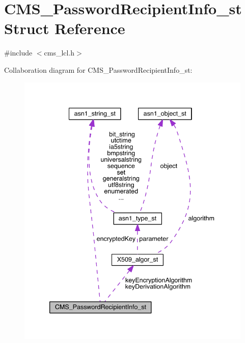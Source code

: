 \hypertarget{struct_c_m_s___password_recipient_info__st}{}\section{C\+M\+S\+\_\+\+Password\+Recipient\+Info\+\_\+st Struct Reference}
\label{struct_c_m_s___password_recipient_info__st}


{\ttfamily \#include $<$cms\+\_\+lcl.\+h$>$}



Collaboration diagram for C\+M\+S\+\_\+\+Password\+Recipient\+Info\+\_\+st\+:\nopagebreak
\begin{figure}[H]
\begin{center}
\leavevmode
\includegraphics[width=339pt]{struct_c_m_s___password_recipient_info__st__coll__graph}
\end{center}
\end{figure}
